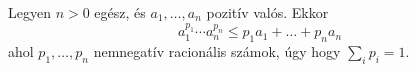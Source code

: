 Legyen $n>0$ egész, és $a_{1},\hdots,a_{n}$ pozitív valós. Ekkor 
$$
a_{1}^{p_{1}}\cdots a_{n}^{p_{n}} \le  
p_{1}a_{1}+\hdots+p_{n}a_{n} 
$$
ahol $p_{1},\hdots,p_{n}$ nemnegatív racionális számok, úgy hogy $\sum_{i} p_i=1.$
